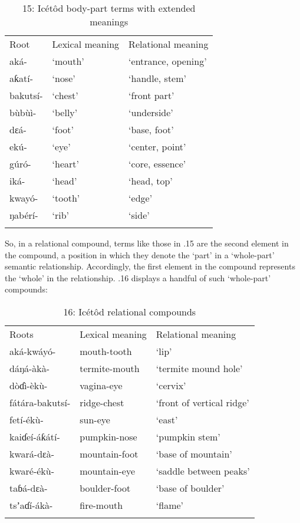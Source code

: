 \begin{table}
\caption{15: Icétôd body-part terms with extended meanings}
\label{tab:4}


\begin{tabularx}{\textwidth}{XXX}
\lsptoprule

Root & Lexical meaning & Relational meaning\\
aká- & ‘mouth’ & ‘entrance, opening’\\
aƙatí- & ‘nose’ & ‘handle, stem’\\
bakutsí- & ‘chest’ & ‘front part’\\
bùbùì- & ‘belly’ & ‘underside’\\
dɛá- & ‘foot’ & ‘base, foot’\\
ekú- & ‘eye’ & ‘center, point’\\
gúró- & ‘heart’ & ‘core, essence’\\
iká- & ‘head’ & ‘head, top’\\
kwayó- & ‘tooth’ & ‘edge’\\
ŋabérí- & ‘rib’ & ‘side’\\
\lspbottomrule
\end{tabularx}
\end{table}
So, in a relational compound, terms like those in .15 are the second element in the compound, a position in which they denote the ‘part’ in a ‘whole-part’ semantic relationship. Accordingly, the first element in the compound represents the ‘whole’ in the relationship. .16 displays a handful of such ‘whole-part’ compounds:


\begin{table}
\caption{16: Icétôd relational compounds}
\label{tab:4}


\begin{tabularx}{\textwidth}{XXX}
\lsptoprule

Roots & Lexical meaning & Relational meaning\\
aká-kwáyó- & mouth-tooth & ‘lip’\\
dáŋá-àkà- & termite-mouth & ‘termite mound hole’\\
dòɗì-èkù- & vagina-eye & ‘cervix’\\
fátára-bakutsí- & ridge-chest & ‘front of vertical ridge’\\
fetí-ékù- & sun-eye & ‘east’\\
kaiɗeí-áƙátí- & pumpkin-nose & ‘pumpkin stem’\\
kwará-dɛà- & mountain-foot & ‘base of mountain’\\
kwaré-ékù- & mountain-eye & ‘saddle between peaks’\\
taɓá-dɛà- & boulder-foot & ‘base of boulder’\\
tsʼaɗí-ákà- & fire-mouth & ‘flame’\\
\lspbottomrule
\end{tabularx}
\end{table}

